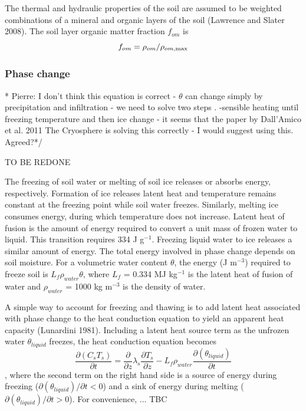 \documentclass{article}
\begin{document}
The thermal and hydraulic properties of the soil are assumed to be weighted combinations of a mineral and organic layers of the soil (Lawrence and Slater 2008). The soil layer organic matter fraction $f_{om}$ is 
\begin{equation}
    f_{om} = \rho_{om}/\rho_{om,{\rm max}}
\end{equation}



\subsubsection{Phase change}

* Pierre: I don't think this equation is correct - $\theta$ can change simply by precipitation and infiltration - we need to solve two steps . -sensible heating until freezing temperature and then ice change - it seems that the paper by Dall’Amico et al. 2011 The Cryosphere is solving this correctly - I would suggest using this. Agreed?*/ 

TO BE REDONE 

The freezing of soil water or melting of soil ice releases or absorbs energy, respectively. Formation of ice releases latent heat and temperature remains constant at the freezing point while soil water freezes. Similarly, melting ice consumes energy, during which temperature does not increase. Latent heat of fusion is the amount of energy required to convert a unit mass of frozen water to liquid. This transition requires 334 J g$^{-1}$. Freezing liquid water to ice releases a similar amount of energy. The total energy involved in phase change depends on soil moisture. For a volumetric water content $\theta$, the energy (J m$^{-3}$) required to freeze soil is $L_f \rho_{water} \theta$, where $L_f$ = 0.334 MJ kg$^{-1}$ is the latent heat of fusion of water and $\rho_{water}$ = 1000 kg m$^{-3}$ is the density of water.

A simple way to account for freezing and thawing is to add latent heat associated with phase change to the heat conduction equation to yield an apparent heat capacity (Lunardini 1981). Including a latent heat source term as the unfrozen water $\theta_{liquid}$ freezes, the heat conduction equation becomes
\begin{equation}
     \frac{\partial (C_s T_s) }{\partial t} = \frac{\partial }{\partial z}\lambda_s \frac{\partial T_s }{\partial z} - L_f \rho_{water} \frac{\partial (\theta_{liquid}) }{\partial t}
\end{equation},
where the second term on the right hand side is a source of energy during freezing ($\partial (\theta_{liquid})/{\partial t} < 0 $) and a sink of energy during melting ($\partial (\theta_{liquid})/{\partial t} > 0 $). For convenience, ... TBC
\end{document}
